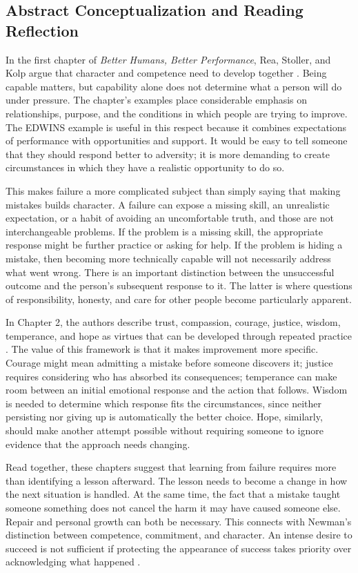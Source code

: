 \documentclass[12pt,stu,biblatex]{apa7}
\begin{document}
\subsection{Abstract Conceptualization and Reading Reflection}
In the first chapter of \textit{Better Humans, Better Performance}, Rea, Stoller, and Kolp argue that character and competence need to develop together \parencite[ch. 1]{Rea2022better}.
Being capable matters, but capability alone does not determine what a person will do under pressure.
The chapter's examples place considerable emphasis on relationships, purpose, and the conditions in which people are trying to improve.
The EDWINS example is useful in this respect because it combines expectations of performance with opportunities and support.
It would be easy to tell someone that they should respond better to adversity; it is more demanding to create circumstances in which they have a realistic opportunity to do so.

This makes failure a more complicated subject than simply saying that making mistakes builds character.
A failure can expose a missing skill, an unrealistic expectation, or a habit of avoiding an uncomfortable truth, and those are not interchangeable problems.
If the problem is a missing skill, the appropriate response might be further practice or asking for help.
If the problem is hiding a mistake, then becoming more technically capable will not necessarily address what went wrong.
There is an important distinction between the unsuccessful outcome and the person's subsequent response to it.
The latter is where questions of responsibility, honesty, and care for other people become particularly apparent.

In Chapter 2, the authors describe trust, compassion, courage, justice, wisdom, temperance, and hope as virtues that can be developed through repeated practice \parencite[ch. 2]{Rea2022better}.
The value of this framework is that it makes improvement more specific.
Courage might mean admitting a mistake before someone discovers it; justice requires considering who has absorbed its consequences; temperance can make room between an initial emotional response and the action that follows.
Wisdom is needed to determine which response fits the circumstances, since neither persisting nor giving up is automatically the better choice.
Hope, similarly, should make another attempt possible without requiring someone to ignore evidence that the approach needs changing.

Read together, these chapters suggest that learning from failure requires more than identifying a lesson afterward.
The lesson needs to become a change in how the next situation is handled.
At the same time, the fact that a mistake taught someone something does not cancel the harm it may have caused someone else.
Repair and personal growth can both be necessary.
This connects with Newman's distinction between competence, commitment, and character.
An intense desire to succeed is not sufficient if protecting the appearance of success takes priority over acknowledging what happened \parencite[ch. 1]{Newman2019building}.
\end{document}
